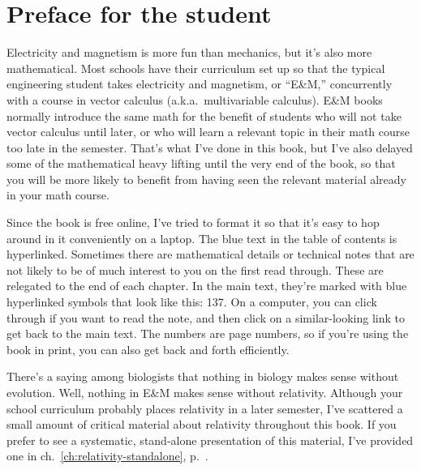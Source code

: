 \section*{Preface for the student}%
\label{student-preface}

Electricity and magnetism is more fun than mechanics, but it's
also more mathematical. Most schools have their curriculum set up
so that the typical engineering student takes electricity and magnetism,
or ``E\&M,'' concurrently with a course in vector calculus (a.k.a.~multivariable
calculus). E\&M books normally introduce the same math for the benefit of
students who will not take vector calculus until later, or who will learn
a relevant topic in their math course too late in the semester. That's
what I've done in this book, but I've also delayed some of the mathematical
heavy lifting until the very end of the book, so that you will be more likely to
benefit from having seen the relevant material already in your math
course.

Since the book is free online, I've tried to format it so that it's
easy to hop around in it conveniently on a laptop. The blue text in the
table of contents is hyperlinked. Sometimes there are mathematical details or technical notes that
are not likely to be of much interest to you on the first read through.
These are relegated to the end of each chapter. In the main text, they're
marked with blue hyperlinked symbols that look like this: 
\dangerousbend{}137. On a computer, you can click through if you want to
read the note, and then click on a similar-looking link to get back to
the main text. The numbers are page numbers, so if you're using the book in print,
you can also get back and forth efficiently.

There's a saying among biologists that nothing in biology makes sense without
evolution. Well, nothing in E\&M makes sense without relativity. Although
your school curriculum probably places relativity in a later semester, I've
scattered a small amount of critical material about relativity throughout
this book. If you prefer to see a systematic, stand-alone presentation of
this material, I've provided one in ch.~\ref{ch:relativity-standalone}, p.~\pageref{ch:relativity-standalone}.
